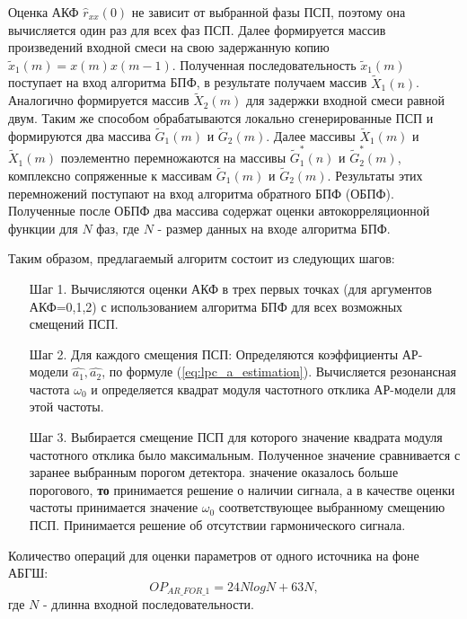 Оценка АКФ ${\hat{r}_{xx}(0)}$ не зависит от выбранной фазы ПСП, поэтому она вычисляется один
раз для всех фаз ПСП. Далее формируется массив произведений входной смеси на
свою задержанную копию ${\tilde{x}_1(m)=x(m)x(m-1)}$. Полученная последовательность  
${\tilde{x}_1(m)}$ поступает на вход алгоритма БПФ, в результате получаем массив ${\tilde{X}_1(n)}$.
Аналогично формируется массив  ${\tilde{X}_2(m)}$ для
задержки входной смеси равной двум. Таким же способом обрабатываются локально
сгенерированные ПСП и формируются два массива ${\tilde{G}_1(m)}$ и ${\tilde{G}_2(m)}$.
Далее массивы ${\tilde{X}_1(m)}$ и ${\tilde{X}_1(m)}$ поэлементно перемножаются
на массивы ${\tilde{G}_1^*(n)}$ и ${\tilde{G}_2^*(m)}$, комплексно сопряженные к массивам ${\tilde{G}_1(m)}$ и ${\tilde{G}_2(m)}$.
Результаты этих перемножений поступают на вход алгоритма обратного
БПФ (ОБПФ). Полученные после ОБПФ два массива содержат оценки автокорреляционной функции для ${N}$ 
фаз, где  ${N}$ - размер данных на входе алгоритма БПФ.

Таким образом, предлагаемый алгоритм состоит из следующих шагов:

\begin{itemize}[align=left,style=nextline,leftmargin=*,labelsep=\parindent,font=\normalfont]
\item[Шаг 1.] Вычисляются оценки  АКФ в трех первых точках (для аргументов АКФ=0,1,2)
	с использованием алгоритма БПФ для всех возможных смещений ПСП. 
\item[Шаг 2.] Для каждого смещения ПСП: 
	Определяются коэффициенты АР-модели ${\hat{a_1}, \hat{a_2}}$, 
	по формуле (\ref{eq:lpc_a_estimation}). 
	Вычисляется резонансная частота ${\omega_0}$
	и определяется квадрат модуля частотного отклика АР-модели для этой частоты. 
\item[Шаг 3.] Выбирается смещение ПСП для которого значение квадрата модуля частотного отклика было максимальным. Полученное значение сравнивается с заранее выбранным порогом детектора. 
	  значение оказалось больше порогового, {\bf{то}} 
		принимается решение о наличии сигнала, а в качестве оценки
		частоты принимается значение ${\omega_0}$ соответствующее выбранному смещению ПСП. 
		Принимается решение об отсутствии гармонического сигнала.
\end{itemize}

Количество операций для оценки параметров от одного источника на фоне АБГШ:
\begin{equation}
	OP_{AR\_FOR\_1} = 24NlogN + 63N,
\end{equation}
где ${N}$ - длинна входной последовательности.

